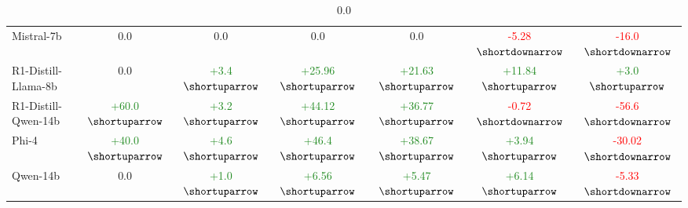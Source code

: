 \begin{table}[H]
\begin{tabular}{lcccccc}
    Mistral-7b                                          & 0.0                   & 0.0                   & 0.0                & 0.0                & \textcolor{red}{-5.28$\shortdownarrow$}              & \textcolor{red}{-16.0$\shortdownarrow$}                \\
    R1-Distill-Llama-8b                                 & 0.0                   & \textcolor{ForestGreen}{+3.4$\shortuparrow$}                   & \textcolor{ForestGreen}{+25.96$\shortuparrow$}                & \textcolor{ForestGreen}{+21.63$\shortuparrow$}                & \textcolor{ForestGreen}{+11.84$\shortuparrow$}              & \textcolor{ForestGreen}{+3.0$\shortuparrow$}                \\
    R1-Distill-Qwen-14b                                 & \textcolor{ForestGreen}{+60.0$\shortuparrow$}                   & \textcolor{ForestGreen}{+3.2$\shortuparrow$}                   & \textcolor{ForestGreen}{+44.12$\shortuparrow$}                & \textcolor{ForestGreen}{+36.77$\shortuparrow$}                & \textcolor{red}{-0.72$\shortdownarrow$}              & \textcolor{red}{-56.6$\shortdownarrow$}                \\
    Phi-4                                               & \textcolor{ForestGreen}{+40.0$\shortuparrow$}                   & \textcolor{ForestGreen}{+4.6$\shortuparrow$}                   & \textcolor{ForestGreen}{+46.4$\shortuparrow$}                & \textcolor{ForestGreen}{+38.67$\shortuparrow$}                & \textcolor{ForestGreen}{+3.94$\shortuparrow$}              & \textcolor{red}{-30.02$\shortdownarrow$}                \\
    Qwen-14b                                            & 0.0                   & \textcolor{ForestGreen}{+1.0$\shortuparrow$}                   & \textcolor{ForestGreen}{+6.56$\shortuparrow$}                & \textcolor{ForestGreen}{+5.47$\shortuparrow$}                & \textcolor{ForestGreen}{+6.14$\shortuparrow$}              & \textcolor{red}{-5.33$\shortdownarrow$}                \\ \hline
    \end{tabular}
    \caption{0.0}
    \label{tab:\textcolor{ForestGreen}{+3.4$\shortuparrow$}}
    \end{table}
    